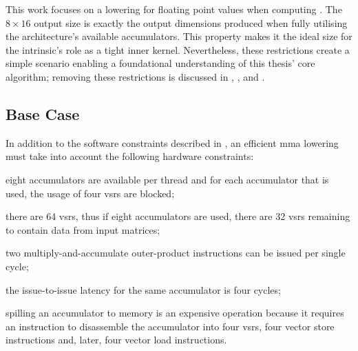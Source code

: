 \documentclass[\main/thesis.tex]{subfiles}
\begin{document}
This work focuses on a lowering for floating point values when computing .
The $8 \times 16$ output size is exactly the output dimensions produced when fully utilising the architecture's available accumulators.
This property makes it the ideal size for the \gls{intrinsic}'s role as a tight inner kernel.
Nevertheless, these restrictions create a simple scenario enabling a foundational understanding of this thesis' core algorithm; removing these restrictions is discussed in , , and .

\subsection{Base Case}
\label{sec:baseCase}
In addition to the software constraints described in , an efficient \gls{mma} lowering must take into account the following hardware constraints:
\begin{enumerate*}[itemjoin*={{ and }}, label=\fbox{\arabic*}]
  \item eight accumulators are available per thread and for each accumulator that is used, the usage of four \glspl{vsr} are blocked;
  \item there are 64 \glspl{vsr}, thus if eight accumulators are used, there are 32 \glspl{vsr} remaining to contain data from input matrices;
  \item two multiply-and-accumulate outer-product instructions can be issued per single cycle;
  \item the issue-to-issue latency for the same accumulator is four cycles;
  \item spilling an accumulator to memory is an expensive operation because it requires an instruction to disassemble the accumulator into four \glspl{vsr}, four vector store instructions and, later, four vector load instructions.
\end{enumerate*}
\end{document}
